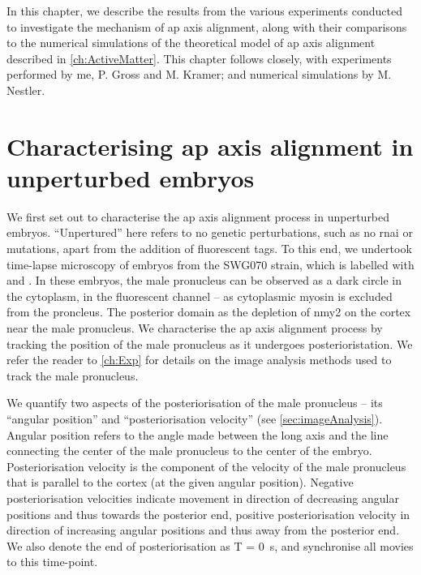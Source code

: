 In this chapter, we describe the results from the various experiments conducted to investigate the mechanism of \ac{ap} axis alignment, along with their comparisons to the numerical simulations of the theoretical model of \ac{ap} axis alignment described in \autoref{ch:ActiveMatter}. This chapter follows \citep{} closely, with experiments performed by me, P. Gross and M. Kramer; and numerical simulations by M. Nestler. 

\section{Characterising \acs{ap} axis alignment in unperturbed embryos} \label{sec:apAxisAlignCharacteriseWT}
We first set out to characterise the \ac{ap} axis alignment process in unperturbed embryos. \enquote{Unpertured} here refers to no genetic perturbations, such as no \ac{rnai} or mutations, apart from the addition of fluorescent tags. To this end, we undertook time-lapse microscopy of embryos from the SWG070 strain, which is labelled with  and . In these embryos, the male pronucleus can be observed as a dark circle in the cytoplasm, in the  fluorescent channel -- as cytoplasmic myosin is excluded from the proncleus. The posterior domain as the depletion of \ac{nmy2} on the cortex near the male pronucleus. We characterise the \ac{ap} axis alignment process by tracking the position of the male pronucleus as it undergoes posterioristation. We refer the reader to \autoref{ch:Exp} for details on the image analysis methods used to track the male pronucleus. 

We quantify two aspects of the posteriorisation of the male pronucleus -- its \enquote{angular position} and \enquote{posteriorisation velocity} (see \autoref{sec:imageAnalysis}). Angular position refers to the angle made between the long axis and the line connecting the center of the male pronucleus to the center of the embryo. Posteriorisation velocity is the component of the velocity of the male pronucleus that is parallel to the cortex (at the given angular position). Negative posteriorisation velocities indicate movement in direction of decreasing angular positions and thus towards the posterior end, positive posteriorisation velocity in direction of increasing angular positions and thus away from the posterior end. We also denote the end of posteriorisation as T = \SI{0}{\second}, and synchronise all movies to this time-point. 

